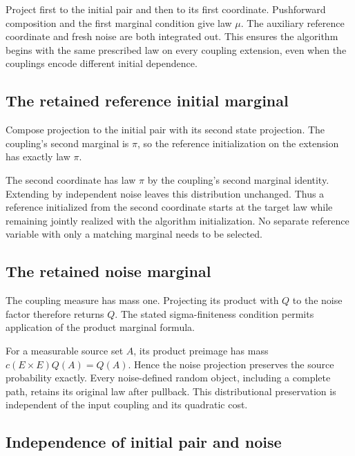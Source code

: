 \documentclass[11pt,a4paper]{report}
\begin{document}
Project first to the initial pair and then to its first coordinate. Pushforward composition and the first marginal condition give law \(\mu\). The auxiliary reference coordinate and fresh noise are both integrated out. This ensures the algorithm begins with the same prescribed law on every coupling extension, even when the couplings encode different initial dependence.

\subsection{\texorpdfstring{The retained reference initial marginal}{The retained reference initial marginal}}
\label{report-step-UnadjustedLangevin-InitialExtension-lean-6}


Compose projection to the initial pair with its second state projection. The coupling's second marginal is \(\pi\), so the reference initialization on the extension has exactly law \(\pi\).



The second coordinate has law \(\pi\) by the coupling's second marginal identity. Extending by independent noise leaves this distribution unchanged. Thus a reference initialized from the second coordinate starts at the target law while remaining jointly realized with the algorithm initialization. No separate reference variable with only a matching marginal needs to be selected.

\subsection{\texorpdfstring{The retained noise marginal}{The retained noise marginal}}
\label{report-step-UnadjustedLangevin-InitialExtension-lean-7}


The coupling measure has mass one. Projecting its product with \(Q\) to the noise factor therefore returns \(Q\). The stated sigma-finiteness condition permits application of the product marginal formula.



For a measurable source set \(A\), its product preimage has mass \(c(E\times E)Q(A)=Q(A)\). Hence the noise projection preserves the source probability exactly. Every noise-defined random object, including a complete path, retains its original law after pullback. This distributional preservation is independent of the input coupling and its quadratic cost.

\subsection{\texorpdfstring{Independence of initial pair and noise}{Independence of initial pair and noise}}
\label{report-step-UnadjustedLangevin-InitialExtension-lean-8}
\end{document}

